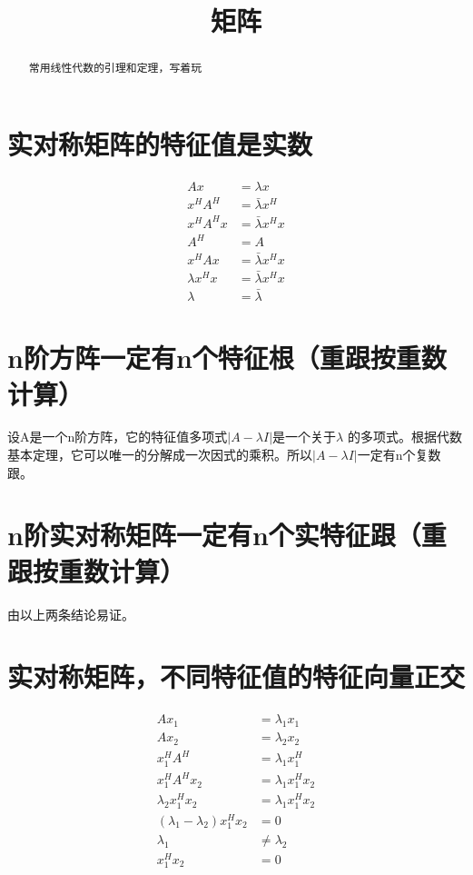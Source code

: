 \documentclass[]{article}
\title{矩阵}
\author{}
\begin{document}
\maketitle

\begin{abstract}
常用线性代数的引理和定理，写着玩
\end{abstract}

\section{实对称矩阵的特征值是实数}
\begin{equation}\label{key}
\begin{aligned}
Ax &= \lambda x \\
x^H A^H &= \bar{\lambda} x^H \\
x^H A^H x &= \bar{\lambda} x^H x \\
A^H &= A \\
x^H A x &= \bar{\lambda} x^H x \\
\lambda x^H x &= \bar{\lambda} x^H x \\
\lambda &= \bar{\lambda}
\end{aligned}
\end{equation}

\section{n阶方阵一定有n个特征根（重跟按重数计算）}
设A是一个n阶方阵，它的特征值多项式$ \left| A - \lambda I \right| $是一个关于$ \lambda $ 的多项式。根据代数基本定理，它可以唯一的分解成一次因式的乘积。所以$ \left| A - \lambda I \right| $一定有n个复数跟。

\section{n阶实对称矩阵一定有n个实特征跟（重跟按重数计算）}
由以上两条结论易证。

\section{实对称矩阵，不同特征值的特征向量正交}
\begin{equation}\label{key}
\begin{aligned}
A x_1 &= \lambda_1 x_1\\
A x_2 &= \lambda_2 x_2\\
x_1^H A^H &= \lambda_1 x_1^H \\
x_1^H A^H x_2 &= \lambda_1 x_1^H x_2 \\
\lambda_2 x_1^H x_2 &= \lambda_1 x_1^H x_2 \\
(\lambda_1 - \lambda_2) x_1^H x_2 &= 0 \\
\lambda_1 &\neq \lambda_2 \\
x_1^H x_2 &= 0
\end{aligned}
\end{equation}
\end{document}
